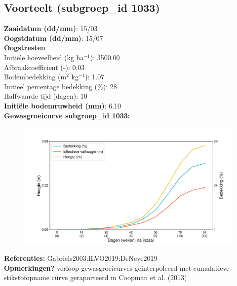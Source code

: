 \documentclass{article}
\begin{document}
 \subsection{Voorteelt (subgroep\_id 1033)} 
  \textbf{Zaaidatum (dd/mm)}: 15/03  \vspace{0.10cm} \\ 
  \textbf{Oogstdatum (dd/mm)}: 15/07  \vspace{0.10cm} \\ 
  \textbf{Oogstresten} \vspace{0.05cm} \\ 
  \tab Initi\"{e}le hoeveelheid (kg ha$^{-1}$): 3500.00 \vspace{0.05cm} \\ 
  \tab Afbraakcoefficient (-): 0.03 \vspace{0.05cm} \\ 
  \tab Bodembedekking (m$^2$ kg$^{-1}$): 1.07 \vspace{0.05cm} \\ 
  \tab Initieel percentage bedekking (\%): 28 \vspace{0.05cm} \\ 
  \tab Halfwaarde tijd (dagen): 10 \vspace{0.05cm} \\ 
  \textbf{Initi\"{e}le bodemruwheid (mm)}: 6.10 \vspace{0.05cm} \\ 
  \textbf{Gewasgroeicurve subgroep\_id 1033:} 
 \begin{center} \begin{figure}[H] \includegraphics[width=12.5cm]{temp/1033.png} \end{figure} \end{center} 
  \textbf{Referenties:} Gabriels2003;ILVO2019;DeNeve2019 \vspace{0.10cm} \\ 
  \textbf{Opmerkingen?} verloop gewasgroeicurves geinterpoleerd met cumulatieve stikstofopname curve geraporteerd in Coopman et al. (2013) \vspace{0.10cm} \\ 
 \newpage 
\end{document}
